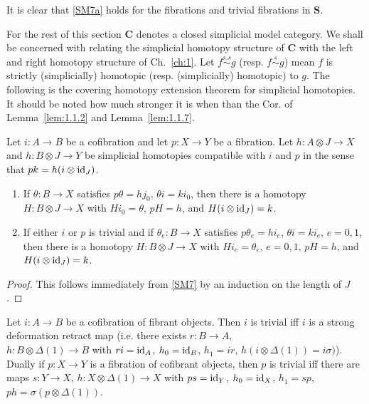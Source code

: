 \documentclass[../main]{subfiles}
\begin{document}
\begin{remark*}
    It is clear that \ref{SM7a} holds for the fibrations and trivial fibrations in $\mathbf{S}$.
\end{remark*}

For the rest of this section $\mathbf{C}$ denotes a closed simplicial model category. We shall be concerned with relating the simplicial homotopy structure of $\mathbf{C}$ with the left and right homotopy structure of Ch.~\ref{ch:1}. Let $f \overset{s.s}{\sim} g$ (resp. $f \overset{s}{\sim} g$) mean $f$ is strictly (simplicially) homotopic (resp. (simplicially) homotopic) to $g$. The following is the covering homotopy extension theorem for simplicial homotopies. It should be noted how much stronger it is when than the Cor. of Lemma~\ref{lem:1.1.2} and Lemma~\ref{lem:1.1.7}.

\begin{proposition}\label{prop:2.2.4}
    Let $i \colon A \longrightarrow  B$ be a cofibration and let $p \colon X \longrightarrow  Y$ be a fibration. Let $h \colon A \otimes J \longrightarrow  X$ and $h \colon B \otimes J \longrightarrow  Y$ be simplicial homotopies compatible with $i$ and $p$ in the sense that $pk = h(i\otimes \operatorname{id}_J)$.
    \begin{enumerate}[label = (\arabic*)]
        \item If $\theta \colon B \longrightarrow  X$ satisfies $p \theta = hj_0$, $\theta i = ki_0$, then there is a homotopy $H \colon B \otimes J \longrightarrow  X$ with $Hi_0 = \theta$, $pH = h$, and $H(i \otimes \operatorname{id}_J) = k$.
        \item If either $i$ or $p$ is trivial and if $\theta_e \colon B \longrightarrow  X$ satisfies $p\theta_e = hi_e$, $\theta i = ki_e$, $e = 0,1$, then there is a homotopy $H \colon B \otimes J \longrightarrow  X$ with $Hi_e = \theta_e$, $e=0,1$, $pH = h$, and $H(i \otimes \operatorname{id}_J)=k$. 
    \end{enumerate}
\end{proposition}

\begin{proof}
    This follows immediately from \ref{SM7} by an induction on the length of $J$.
\end{proof}

\begin{corollary*}
    Let $i \colon A \longrightarrow  B$ be a cofibration of fibrant objects. Then $i$ is trivial iff $i$ is a strong deformation retract map (i.e. there exists $r \colon B \longrightarrow  A,$\\$ h \colon B\otimes \Delta(1) \longrightarrow  B$ with $ri = \operatorname{id}_A$, $h_0 = \operatorname{id}_B$, $h_1 = ir$, $h(i \otimes \Delta(1)) = i\sigma)$). Dually if $p \colon X \longrightarrow  Y$ is a fibration of cofibrant objects, then $p$ is trivial iff there are maps $s \colon Y \longrightarrow  X$, $h \colon X \otimes \Delta(1) \longrightarrow  X$ with $ps = \operatorname{id}_Y$, $h_0  =\operatorname{id}_X$, $h_1 = sp$, $ph = \sigma(p \otimes \Delta(1))$.
\end{corollary*}
\end{document}
